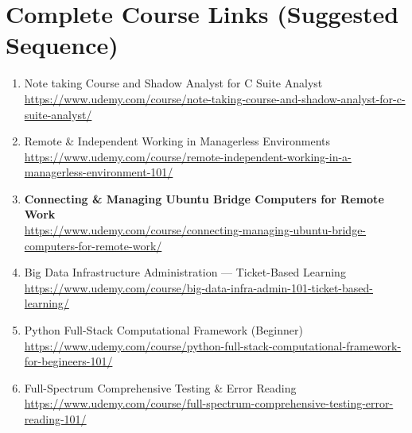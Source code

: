 \documentclass[12pt]{article}
\begin{document}
	\section*{Complete Course Links (Suggested Sequence)}
	
	\begin{enumerate}[label=\textbf{Course \arabic*:}]
		
		\item Note taking Course and Shadow Analyst for C Suite Analyst\\
		\href{https://www.udemy.com/course/note-taking-course-and-shadow-analyst-for-c-suite-analyst/}
		{https://www.udemy.com/course/note-taking-course-and-shadow-analyst-for-c-suite-analyst/}
		
		\item Remote \& Independent Working in Managerless Environments \\
		\href{https://www.udemy.com/course/remote-independent-working-in-a-managerless-environment-101/}
		{https://www.udemy.com/course/remote-independent-working-in-a-managerless-environment-101/}
		
		\item \textbf{Connecting \& Managing Ubuntu Bridge Computers for Remote Work} \\
		\href{https://www.udemy.com/course/connecting-managing-ubuntu-bridge-computers-for-remote-work/}
		{https://www.udemy.com/course/connecting-managing-ubuntu-bridge-computers-for-remote-work/}
		
		\item Big Data Infrastructure Administration — Ticket-Based Learning \\
		\href{https://www.udemy.com/course/big-data-infra-admin-101-ticket-based-learning/}
		{https://www.udemy.com/course/big-data-infra-admin-101-ticket-based-learning/}
		
		\item Python Full-Stack Computational Framework (Beginner) \\
		\href{https://www.udemy.com/course/python-full-stack-computational-framework-for-begineers-101/}
		{https://www.udemy.com/course/python-full-stack-computational-framework-for-begineers-101/}
		
		\item Full-Spectrum Comprehensive Testing \& Error Reading \\
		\href{https://www.udemy.com/course/full-spectrum-comprehensive-testing-error-reading-101/}
		{https://www.udemy.com/course/full-spectrum-comprehensive-testing-error-reading-101/}
		

\end{enumerate}
\end{document}
